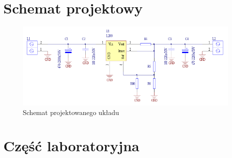 \documentclass[a4paper,12pt]{article}
\begin{document}
\section {Schemat projektowy}
\begin{figure}[h]
  \center
  \includegraphics[width=1\textwidth]{schemat_ukladu}
  \caption{Schemat projektowanego układu}
\end{figure}
\pagebreak
\section{Część laboratoryjna}
\end{document}
